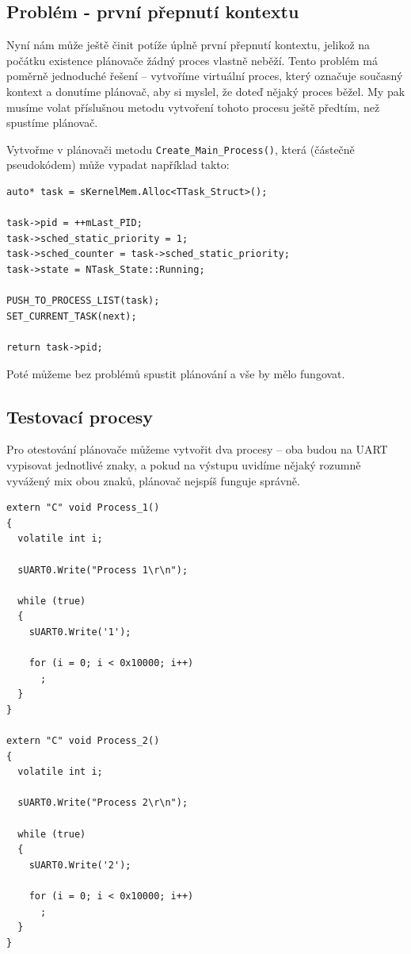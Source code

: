 \documentclass{article}
\begin{document}
\subsection{Problém - první přepnutí kontextu}

Nyní nám může ještě činit potíže úplně první přepnutí kontextu, jelikož na počátku existence plánovače žádný proces vlastně neběží. Tento problém má poměrně jednoduché řešení -- vytvoříme virtuální proces, který označuje současný kontext a donutíme plánovač, aby si myslel, že doteď nějaký proces běžel. My pak musíme volat příslušnou metodu vytvoření tohoto procesu ještě předtím, než spustíme plánovač.

Vytvořme v plánovači metodu \texttt{Create\_Main\_Process()}, která (částečně pseudokódem) může vypadat například takto:
\begin{lstlisting}
auto* task = sKernelMem.Alloc<TTask_Struct>();

task->pid = ++mLast_PID;
task->sched_static_priority = 1;
task->sched_counter = task->sched_static_priority;
task->state = NTask_State::Running;

PUSH_TO_PROCESS_LIST(task);
SET_CURRENT_TASK(next);

return task->pid;
\end{lstlisting}

Poté můžeme bez problémů spustit plánování a vše by mělo fungovat.

\subsection{Testovací procesy}

Pro otestování plánovače můžeme vytvořit dva procesy -- oba budou na UART vypisovat jednotlivé znaky, a pokud na výstupu uvidíme nějaký rozumně vyvážený mix obou znaků, plánovač nejspíš funguje správně.

\begin{lstlisting}
extern "C" void Process_1()
{
  volatile int i;
	
  sUART0.Write("Process 1\r\n");
	
  while (true)
  {
    sUART0.Write('1');
	
    for (i = 0; i < 0x10000; i++)
      ;
  }
}

extern "C" void Process_2()
{
  volatile int i;
	
  sUART0.Write("Process 2\r\n");
	
  while (true)
  {
    sUART0.Write('2');

    for (i = 0; i < 0x10000; i++)
      ;
  }
}
\end{lstlisting}
\end{document}

